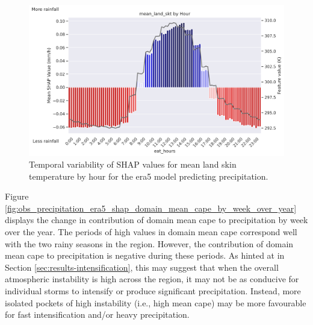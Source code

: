 \begin{figure}[ht]
    \centering
    \includegraphics[width=\textwidth]{../figures/generated/experiments/obs_precipitation/temporal_corr/obs_precipitation_era5_shap_mean_land_skt_by_hour.png}
    \caption{Temporal variability of SHAP values for mean land skin temperature by hour for the \acrshort{era5} model predicting precipitation.}
    \label{fig:obs_precipitation_era5_shap_mean_land_skt_by_hour}
\end{figure}

Figure \ref{fig:obs_precipitation_era5_shap_domain_mean_cape_by_week_over_year} displays the change in contribution of domain mean \acrshort{cape} to precipitation by week over the year. The periods of high values in domain mean \acrshort{cape} correspond well with the two rainy seasons in the region. However, the contribution of domain mean \acrshort{cape} to precipitation is negative during these periods. As hinted at in Section \ref{sec:results-intensification}, this may suggest that when the overall atmospheric instability is high across the region, it may not be as conducive for individual storms to intensify or produce significant precipitation. Instead, more isolated pockets of high instability (i.e., high mean \acrshort{cape}) may be more favourable for fast intensification and/or heavy precipitation.

